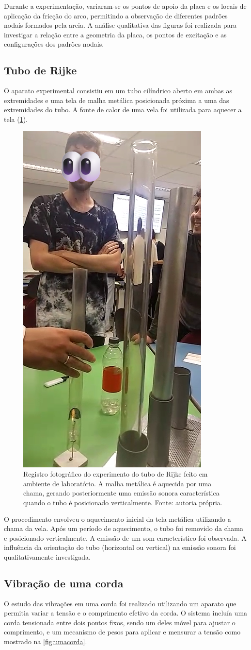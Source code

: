 Durante a experimentação, variaram-se os pontos de apoio da placa e os locais de aplicação da fricção do arco, permitindo a observação de diferentes padrões nodais formados pela areia. A análise qualitativa das figuras foi realizada para investigar a relação entre a geometria da placa, os pontos de excitação e as configurações dos padrões nodais.

\subsection{Tubo de Rijke}
O aparato experimental consistiu em um tubo cilíndrico aberto em ambas as extremidades e uma tela de malha metálica posicionada próxima a uma das extremidades do tubo. A fonte de calor de uma vela foi utilizada para aquecer a tela (\cref{fig:rijke}).

\begin{figure}[H]
    \centering
    \includegraphics[width=0.35\linewidth]{fig/rijke.png}
    \caption{Registro fotográfico do experimento do tubo de Rijke feito em ambiente de laboratório. A malha metálica é aquecida por uma chama, gerando posteriormente uma emissão sonora característica quando o tubo é posicionado verticalmente. Fonte: autoria própria.}
    \label{fig:rijke}
\end{figure}

O procedimento envolveu o aquecimento inicial da tela metálica utilizando a chama da vela. Após um período de aquecimento, o tubo foi removido da chama e posicionado verticalmente. A emissão de um som característico foi observada. A influência da orientação do tubo (horizontal ou vertical) na emissão sonora foi qualitativamente investigada.

\subsection{Vibração de uma corda}
O estudo das vibrações em uma corda foi realizado utilizando um aparato que permitia variar a tensão e o comprimento efetivo da corda. O sistema incluía uma corda tensionada entre dois pontos fixos, sendo um deles móvel para ajustar o comprimento, e um mecanismo de pesos para aplicar e mensurar a tensão como mostrado na \cref{fig:umacorda}.

